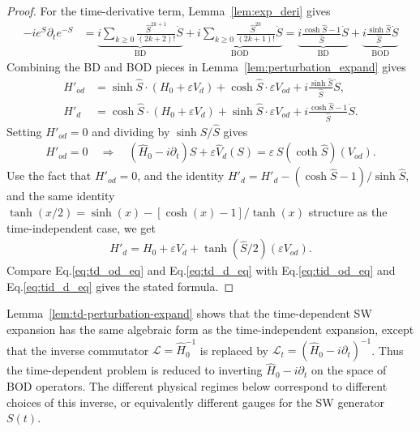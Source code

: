 \begin{proof}
For the time-derivative term, Lemma~\ref{lem:exp_deri} gives
\begin{align}
-ie^S\partial_t e^{-S}
&= \underbrace{i\sum_{k\geq0}\frac{\hat S^{2k+1}}{(2k+2)!}\dot S
}_{\text{BD}}+\underbrace{i\sum_{k\geq0}\frac{\hat S^{2k}}{(2k+1)!}\dot S}_{\text{BOD}} = \underbrace{i\frac{\cosh\hat S-1}{\hat S}\dot S}_{\text{BD}}+\underbrace{i\frac{\sinh\hat S}{\hat S}\dot S}_{\text{BOD}}
\end{align}
Combining the BD and BOD pieces in Lemma~\ref{lem:perturbation_expand} gives
\begin{align}
H'_{od}
&=\sinh\hat S \cdot \left(H_0+\varepsilon V_d\right)+\cosh\hat S \cdot \varepsilon V_{od}
+i\frac{\sinh\hat S}{\hat S}\dot S,\\
H'_d
&=\cosh\hat S \cdot \left(H_0+\varepsilon V_d\right)+\sinh\hat S \cdot\varepsilon V_{od}
+i\frac{\cosh\hat S-1}{\hat S}\dot S.
\end{align}
Setting $H'_{od}=0$ and dividing by $\sinh\hat S/ \hat{S}$ gives
\begin{align}\label{eq:td_od_eq}
    H'_{od} = 0 \quad \Rightarrow \quad
        (\hat H_0-i\partial_t)S+\varepsilon\hat V_d(S)
    =\varepsilon\,\hat S(\coth \hat{S})(V_{od}).
\end{align}
Use the fact that $H'_{od} = 0$, and the identity $H'_d = H'_d - (\cosh \hat{S} - 1)/ \sinh \hat{S}$,
and the same identity $\tanh(x/2) = \sinh(x) - [\cosh(x) - 1]/{\tanh(x)}$ structure as the time-independent case, we get
\begin{align}\label{eq:td_d_eq}
H'_d
=H_0+\varepsilon V_d+\tanh(\hat S/2)(\varepsilon V_{od}).
\end{align}
Compare Eq.\eqref{eq:td_od_eq} and Eq.\eqref{eq:td_d_eq} with Eq.\eqref{eq:tid_od_eq} and Eq.\eqref{eq:tid_d_eq} gives the stated formula.
\end{proof}

Lemma~\ref{lem:td-perturbation-expand} shows that the time-dependent SW expansion has the same algebraic form as the time-independent expansion, except that the inverse commutator $\mathcal L=\hat H_0^{-1}$ is replaced by
$\mathcal L_t=(\hat H_0-i\partial_t)^{-1}$.
Thus the time-dependent problem is reduced to inverting $\hat H_0-i\partial_t$ on the space of BOD operators.
The different physical regimes below correspond to different choices of this inverse, or equivalently different gauges for the SW generator $S(t)$.

